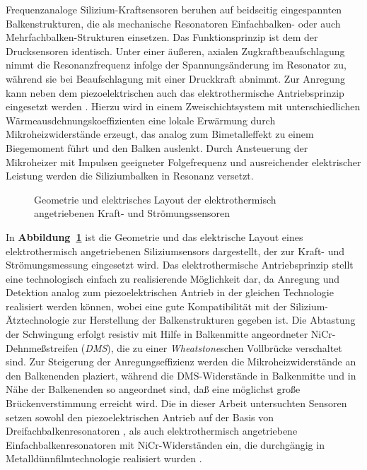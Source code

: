 Frequenzanaloge Silizium-Kraftsensoren beruhen auf beidseitig
eingespannten Balkenstrukturen, die als mechanische Resonatoren
Einfachbalken- \cite{Blo90} oder auch Mehrfachbalken-Strukturen
\cite{Wag94} einsetzen.
Das Funktionsprinzip ist dem der Drucksensoren identisch. Unter einer
äußeren, axialen Zugkraftbeaufschlagung nimmt die Resonanzfrequenz
infolge der Spannungsänderung im Resonator zu, während sie bei
Beaufschlagung mit einer Druckkraft abnimmt. Zur Anregung kann neben
dem piezoelektrischen auch das elektrothermische Antriebsprinzip
eingesetzt werden \cite{Bou90}. Hierzu wird in einem Zweischichtsystem mit
unterschiedlichen Wärmeausdehnungskoeffizienten eine lokale Erwärmung
durch Mikroheizwiderstände erzeugt, das analog zum Bimetalleffekt zu
einem Biegemoment führt und den Balken auslenkt. Durch Ansteuerung
der Mikroheizer mit Impulsen geeigneter Folgefrequenz und ausreichender
elektrischer Leistung werden die Siliziumbalken in Resonanz versetzt.
\begin{figure}[htb]
\begin{center}

\setbalkene
\end{center}
\caption{\label{abbgmssensor}
 Geometrie und elektrisches Layout der elektrothermisch angetriebenen
 Kraft- und Strömungssensoren}
\end{figure}
In {\bf Abbildung~\ref{abbgmssensor}} ist die Geometrie und das
elektrische Layout eines elektrothermisch angetriebenen Siliziumsensors
dargestellt, der zur Kraft- und Strömungsmessung eingesetzt wird.
Das elektrothermische Antriebsprinzip stellt eine technologisch einfach zu
realisierende Möglichkeit dar, da Anregung und Detektion analog zum
piezoelektrischen Antrieb in der gleichen Technologie realisiert werden
können, wobei eine gute Kompatibilität mit der Silizium-Ätztechnologie
zur Herstellung der Balkenstrukturen gegeben ist.  Die Abtastung der
Schwingung erfolgt resistiv mit Hilfe in Balkenmitte angeordneter
NiCr-Dehnmeßstreifen ({\em DMS\/}), die zu einer {\em Wheatstone}schen
Vollbrücke verschaltet sind. Zur Steigerung der Anregungseffizienz
werden die Mikroheizwiderstände an den Balkenenden plaziert, während die
DMS-Widerstände in Balkenmitte und in Nähe der Balkenenden so
angeordnet sind, daß eine möglichst große Brückenverstimmung erreicht
wird. Die in dieser Arbeit untersuchten Sensoren setzen sowohl den
piezo\-elektrischen Antrieb auf der Basis von Dreifachbalkenresonatoren
\cite{Wag94}, als auch elektrothermisch angetriebene
Einfachbalkenresonatoren mit NiCr-Widerständen ein, die durchgängig in
Metalldünnfilmtechnologie realisiert wurden \cite{Bar93}.



